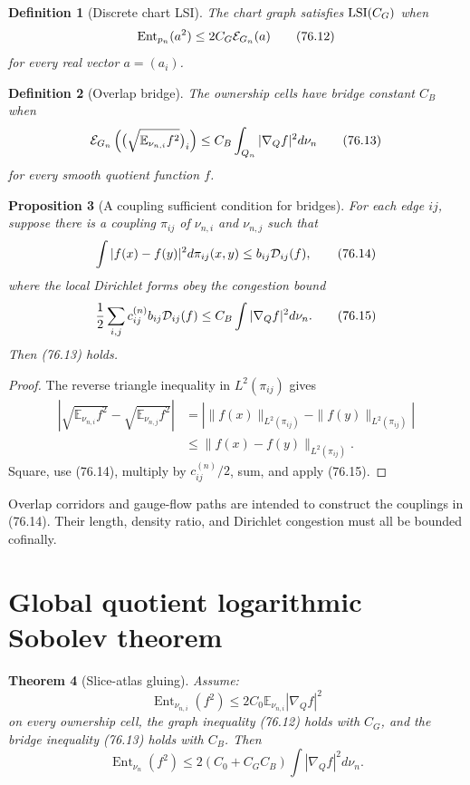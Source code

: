 \documentclass[11pt]{article}
\newtheorem{theorem}{Theorem}[section]
\newtheorem{proposition}[theorem]{Proposition}
\newtheorem{definition}[theorem]{Definition}
\theoremstyle{remark}
\begin{document}
\begin{definition}[Discrete chart LSI]
\label{def:v15v76-graph-lsi}
The chart graph satisfies \({\rm LSI}(C_G)\) when
\[
 \operatorname{Ent}_{p_n}(a^2)
 \leq2C_G{\cal E}_{G_n}(a)                            \tag{76.12}
\]
for every real vector \(a=(a_i)\).
\end{definition}

\begin{definition}[Overlap bridge]
\label{def:v15v76-bridge}
The ownership cells have bridge constant \(C_B\) when
\[
 {\cal E}_{G_n}
 \left(
 \bigl(\sqrt{\mathbb E_{\nu_{n,i}}f^2}\bigr)_i
 \right)
 \leq
 C_B\int_{Q_n}|\nabla_Qf|^2d\nu_n                    \tag{76.13}
\]
for every smooth quotient function \(f\).
\end{definition}

\begin{proposition}[A coupling sufficient condition for bridges]
\label{prop:v15v76-coupling}
For each edge \(ij\), suppose there is a coupling
\(\pi_{ij}\) of \(\nu_{n,i}\) and \(\nu_{n,j}\) such that
\[
 \int|f(x)-f(y)|^2d\pi_{ij}(x,y)
 \leq b_{ij}{\cal D}_{ij}(f),                         \tag{76.14}
\]
where the local Dirichlet forms obey the congestion bound
\[
 \frac12\sum_{i,j}c_{ij}^{(n)}b_{ij}{\cal D}_{ij}(f)
 \leq C_B\int|\nabla_Qf|^2d\nu_n.                    \tag{76.15}
\]
Then (76.13) holds.
\end{proposition}

\begin{proof}
The reverse triangle inequality in
\(L^2(\pi_{ij})\) gives
\[
\begin{split}
 \left|
 \sqrt{\mathbb E_{\nu_{n,i}}f^2}
 -\sqrt{\mathbb E_{\nu_{n,j}}f^2}
 \right|
 &=
 \left|\|f(x)\|_{L^2(\pi_{ij})}
 -\|f(y)\|_{L^2(\pi_{ij})}\right|\\
 &\leq\|f(x)-f(y)\|_{L^2(\pi_{ij})}.
\end{split}
\]
Square, use (76.14), multiply by \(c_{ij}^{(n)}/2\), sum, and
apply (76.15).
\end{proof}

Overlap corridors and gauge-flow paths are intended to construct
the couplings in (76.14).  Their length, density ratio, and
Dirichlet congestion must all be bounded cofinally.

\section{Global quotient logarithmic Sobolev theorem}

\begin{theorem}[Slice-atlas gluing]
\label{thm:v15v76-gluing}
Assume:
\[
 \operatorname{Ent}_{\nu_{n,i}}(f^2)
 \leq2C_0\mathbb E_{\nu_{n,i}}|\nabla_Qf|^2           \tag{76.16}
\]
on every ownership cell, the graph inequality (76.12) holds with
\(C_G\), and the bridge inequality (76.13) holds with \(C_B\).
Then
\[
 \operatorname{Ent}_{\nu_n}(f^2)
 \leq
 2(C_0+C_GC_B)
 \int|\nabla_Qf|^2d\nu_n.                             \tag{76.17}
\]
\end{theorem}
\end{document}
